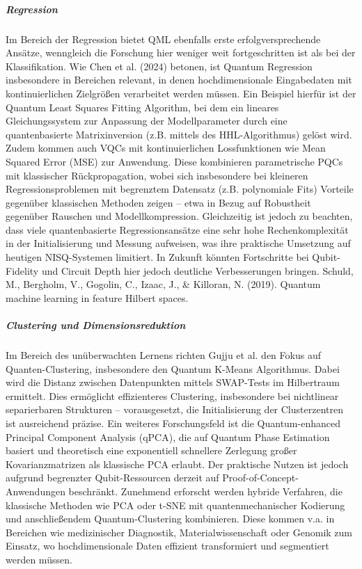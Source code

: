 \subparagraph{Regression}
Im Bereich der Regression bietet QML ebenfalls erste erfolgversprechende Ansätze, wenngleich die Forschung hier weniger weit fortgeschritten ist als bei der Klassifikation. Wie Chen et al. (2024) betonen, ist Quantum Regression insbesondere in Bereichen relevant, in denen hochdimensionale Eingabedaten mit kontinuierlichen Zielgrößen verarbeitet werden müssen. Ein Beispiel hierfür ist der Quantum Least Squares Fitting Algorithm, bei dem ein lineares Gleichungssystem zur Anpassung der Modellparameter durch eine quantenbasierte Matrixinversion (z.B. mittels des HHL-Algorithmus) gelöst wird.
Zudem kommen auch VQCs mit kontinuierlichen Lossfunktionen wie Mean Squared Error (MSE) zur Anwendung. Diese kombinieren parametrische PQCs mit klassischer Rückpropagation, wobei sich insbesondere bei kleineren Regressionsproblemen mit begrenztem Datensatz (z.B. polynomiale Fits) Vorteile gegenüber klassischen Methoden zeigen – etwa in Bezug auf Robustheit gegenüber Rauschen und Modellkompression.
Gleichzeitig ist jedoch zu beachten, dass viele quantenbasierte Regressionsansätze eine sehr hohe Rechenkomplexität in der Initialisierung und Messung aufweisen, was ihre praktische Umsetzung auf heutigen NISQ-Systemen limitiert. In Zukunft könnten Fortschritte bei Qubit-Fidelity und Circuit Depth hier jedoch deutliche Verbesserungen bringen.
Schuld, M., Bergholm, V., Gogolin, C., Izaac, J., & Killoran, N. (2019). Quantum machine learning in feature Hilbert spaces.

\subparagraph{Clustering und Dimensionsreduktion}
Im Bereich des unüberwachten Lernens richten Gujju et al. den Fokus auf Quanten-Clustering, insbesondere den Quantum K-Means Algorithmus. Dabei wird die Distanz zwischen Datenpunkten mittels SWAP-Tests im Hilbertraum ermittelt. Dies ermöglicht effizienteres Clustering, insbesondere bei nichtlinear separierbaren Strukturen – vorausgesetzt, die Initialisierung der Clusterzentren ist ausreichend präzise.
Ein weiteres Forschungsfeld ist die Quantum-enhanced Principal Component Analysis (qPCA), die auf Quantum Phase Estimation basiert und theoretisch eine exponentiell schnellere Zerlegung großer Kovarianzmatrizen als klassische PCA erlaubt. Der praktische Nutzen ist jedoch aufgrund begrenzter Qubit-Ressourcen derzeit auf Proof-of-Concept-Anwendungen beschränkt.
Zunehmend erforscht werden hybride Verfahren, die klassische Methoden wie PCA oder t-SNE mit quantenmechanischer Kodierung und anschließendem Quantum-Clustering kombinieren. Diese kommen v.a. in Bereichen wie medizinischer Diagnostik, Materialwissenschaft oder Genomik zum Einsatz, wo hochdimensionale Daten effizient transformiert und segmentiert werden müssen. \cite{gujjuQuantumMachineLearning2024}


